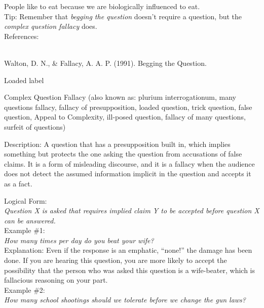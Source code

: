 \documentclass[a4paper,12pt,single,pdftex]{scrbook}
\begin{document}
{    
      People like to eat because we are biologically influenced to eat.
    \\

    

    
      Tip: Remember that {\em begging the question} doesn’t require a question, but the {\it complex question fallacy} does.
    \\

    References:

    
      
        
      \\

      Walton, D. N., \& Fallacy, A. A. P. (1991). Begging the Question.
    
  }


Loaded label

Complex Question Fallacy
    (also known as: plurium interrogationum, many questions fallacy, fallacy of presupposition, loaded question, trick question, false question, Appeal to Complexity, ill-posed question, fallacy of many questions, surfeit of questions)
  
    Description: A question that has a presupposition built in, which implies something but protects the one asking the question from accusations of false claims.  It is a form of misleading discourse, and it is a fallacy when the audience does not detect the assumed information implicit in the question and accepts it as a fact.

    
      Logical Form:
    \\

    
      {\em Question X is asked that requires implied claim Y to be accepted before question X can be answered.}
    \\

    
      Example \#1:
    \\

    
      {\em How many times per day do you beat your wife?}
    \\

    
      Explanation: Even if the response is an emphatic, “none!” the damage has been done.  If you are hearing this question, you are more likely to accept the possibility that the person who was asked this question is a wife-beater, which is fallacious reasoning on your part.
    \\

    
      Example \#2:
    \\

    
      {\em How many school shootings should we tolerate before we change the gun laws?}
    \\
\end{document}
